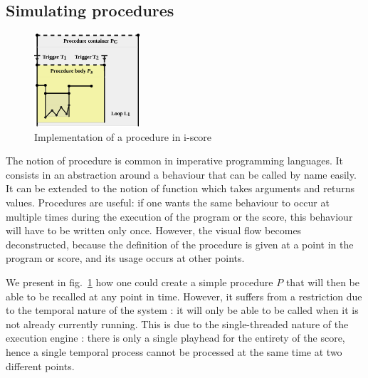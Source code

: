\documentclass{article}
\begin{document}
\subsection{Simulating procedures}
\begin{figure}[h]
\centering
\includegraphics[width=0.35\textwidth]{images/function.eps}
\caption{Implementation of a procedure in i-score}
\label{fig.function}
\end{figure}

The notion of procedure is common in imperative programming languages.
It consists in an abstraction around a behaviour that can be called 
by name easily.
It can be extended to the notion of function which takes arguments 
and returns values.
Procedures are useful: if one wants the same behaviour to occur at multiple times during
the execution of the program or the score, this behaviour will 
have to be written only once.
However, the visual flow becomes deconstructed, because 
the definition of the procedure is given at a point in the program or score, 
and its usage occurs at other points.

We present in fig.~\ref{fig.function} how one could create a simple 
procedure $P$ that will then be able to be recalled at any point in time.
However, it suffers from a restriction due to the temporal nature of the system : 
it will only be able to be called when it is not already currently running. 
This is due to the single-threaded nature of the execution engine : there is 
only a single playhead for the entirety of the score, hence a single 
temporal process cannot be processed at the same time at two different points.
\end{document}

